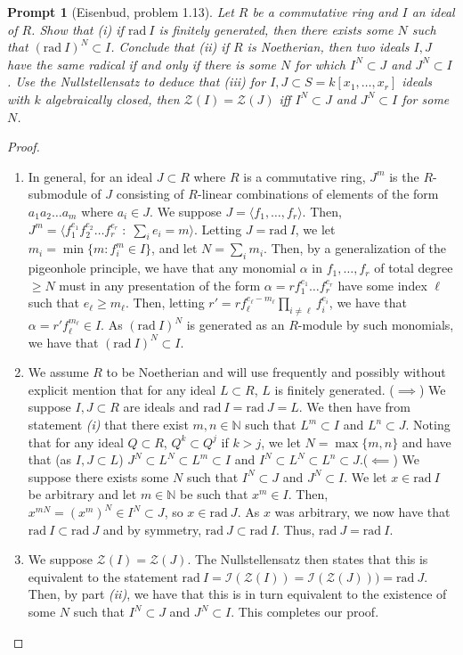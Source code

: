 \documentclass[english]{article}
\newcommand{\NN}{\mathbb{N}}
\newtheorem*{prompt*}{Prompt}
\theoremstyle{remark}
\theoremstyle{definition}
\newcommand{\gen}[1]{\langle #1 \rangle}
\newcommand{\genb}[2]{\langle #1\;:\;#2 \rangle}
\newcommand{\Ii}{\mathcal{I}}
\newcommand{\Zz}{\mathcal{Z}}
\newcommand{\rad}{\mathrm{rad}~}
\begin{document}
\begin{prompt*}[Eisenbud, problem 1.13]
	Let $R$ be a commutative ring and $I$ an ideal of $R$. Show that \emph{(i)} if $\rad I$ is finitely generated, then there exists some $N$ such that $(\rad I)^N\subset I$. Conclude that \emph{(ii)} if $R$ is Noetherian, then two ideals $I, J$ have the same radical if and only if there is some $N$ for which $I^N\subset J$ and $J^N\subset I$. Use the Nullstellensatz to deduce that \emph{(iii)} for $I,J\subset S=k[x_1,\hdots,x_r]$ ideals with $k$ algebraically closed, then $\Zz(I)=\Zz(J)$ iff $I^N\subset J$ and $J^N\subset I$ for some $N$.\end{prompt*}
\begin{proof}
	\begin{enumerate}[label=\emph{(\roman*)}]
		\item In general, for an ideal $J\subset R$ where $R$ is a commutative ring, $J^m$ is the $R$-submodule of $J$ consisting of $R$-linear combinations of elements of the form $a_1a_2\hdots a_m$ where $a_i\in J$. We suppose $J=\gen{f_1,\hdots,f_r}$. Then, $J^m=\genb{f_1^{e_1}f_2^{e_2}\hdots f_r^{e_r}}{\sum_i e_i=m}$. Letting $J=\rad I$, we let $m_i= \min\{m:f_i^m\in I\}$, and let $N=\sum_i m_i$. Then, by a generalization of the pigeonhole principle, we have that any monomial $\alpha$ in $f_1,\hdots,f_r$ of total degree $\geq N$ must in any presentation of the form $\alpha=rf_1^{e_1}\hdots f_r^{e_r}$ have some index $\ell$ such that $e_\ell\geq m_\ell$. Then, letting $r'=rf_\ell^{e_\ell-m_\ell}\prod_{i\neq \ell} f_i^{e_i}$, we have that $\alpha=r'f_\ell^{m_{\ell}}\in I$. As $(\rad I)^N $ is generated as an $R$-module by such monomials, we have that $(\rad I)^N\subset I$.
		\item We assume $R$ to be Noetherian and will use frequently and possibly without explicit mention that for any ideal $L\subset R$, $L$ is finitely generated. \newline ($\implies$) We suppose $I,J\subset R$ are ideals and $\rad I=\rad J=L$. We then have from statement \emph{(i)} that there exist $m,n\in \NN$ such that $L^m\subset I$ and $L^n\subset J$. Noting that for any ideal $Q\subset R$, $Q^k\subset Q^j$ if $k>j$, we let $N=\max\{m,n\}$ and have that (as $I,J\subset L$) $J^N\subset L^N\subset L^m\subset I$ and $I^N\subset L^N\subset L^n\subset J$.\newline ($\impliedby$) We suppose there exists some $N$ such that $I^N\subset J$ and $J^N\subset I$. We let $x\in \rad I$ be arbitrary and let $m\in \NN$ be such that $x^m\in I$. Then, $x^{mN}=(x^m)^N\in I^N\subset J$, so  $x\in \rad J$. As $x$ was arbitrary, we now have that $\rad I\subset \rad J$ and by symmetry, $\rad J\subset \rad I$. Thus, $\rad J=\rad I$. 
		\item We suppose $\Zz(I)=\Zz(J)$. The Nullstellensatz then states that this is equivalent to the statement $\rad I=\Ii(\Zz(I))=\Ii(\Zz(J)))=\rad J$. Then, by part \emph{(ii)}, we have that this is in turn equivalent to the existence of some $N$ such that $I^N\subset J$ and $J^N\subset I$. This completes our proof.
	\end{enumerate}
	\end{proof}
\end{document}
